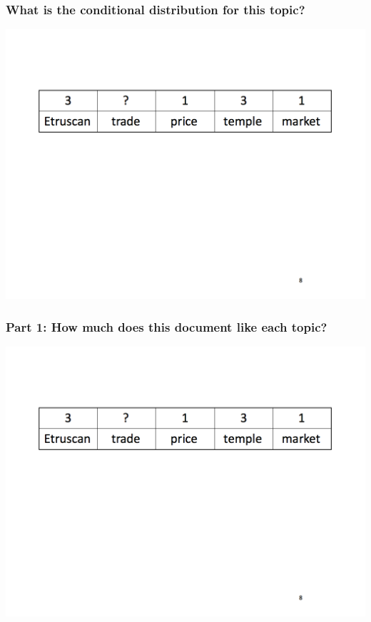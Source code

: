 \begin{frame}
  \frametitle{What is the conditional distribution for this topic?}
    \includegraphics[width=\linewidth]{topic_models/mimno_008}
\end{frame}


\begin{frame}
  \frametitle{Part 1: How much does this document like each topic?}
    \includegraphics[width=\linewidth]{topic_models/mimno_008}
\end{frame}


